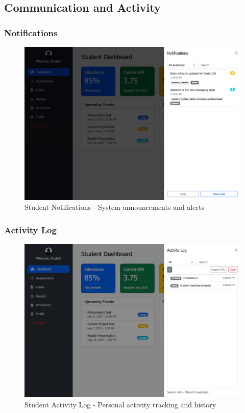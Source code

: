 \documentclass[12pt,a4paper]{article}
\begin{document}
\subsection{Communication and Activity}

\subsubsection{Notifications}
\begin{figure}[H]
    \centering
    \includegraphics[width=\textwidth]{student/student-notifications.png}
    \caption{Student Notifications - System announcements and alerts}
    \label{fig:student-notifications}
\end{figure}

\subsubsection{Activity Log}
\begin{figure}[H]
    \centering
    \includegraphics[width=\textwidth]{student/student-activity-log.png}
    \caption{Student Activity Log - Personal activity tracking and history}
    \label{fig:student-activity}
\end{figure}
\end{document}
